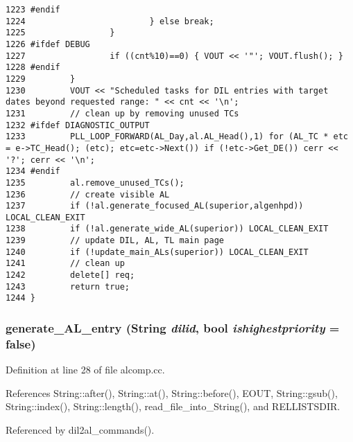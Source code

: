\begin{verbatim}
1223 #endif
1224                         } else break;
1225                 }
1226 #ifdef DEBUG
1227                 if ((cnt%10)==0) { VOUT << '"'; VOUT.flush(); }
1228 #endif
1229         }
1230         VOUT << "Scheduled tasks for DIL entries with target dates beyond requested range: " << cnt << '\n';
1231         // clean up by removing unused TCs
1232 #ifdef DIAGNOSTIC_OUTPUT
1233         PLL_LOOP_FORWARD(AL_Day,al.AL_Head(),1) for (AL_TC * etc = e->TC_Head(); (etc); etc=etc->Next()) if (!etc->Get_DE()) cerr << '?'; cerr << '\n';
1234 #endif
1235         al.remove_unused_TCs();
1236         // create visible AL
1237         if (!al.generate_focused_AL(superior,algenhpd)) LOCAL_CLEAN_EXIT
1238         if (!al.generate_wide_AL(superior)) LOCAL_CLEAN_EXIT
1239         // update DIL, AL, TL main page
1240         if (!update_main_ALs(superior)) LOCAL_CLEAN_EXIT
1241         // clean up
1242         delete[] req;
1243         return true;
1244 }
\end{verbatim}\normalsize 
{}
\subsubsection{ generate\_\-AL\_\-entry ({\bf String} {\em dilid}, bool {\em ishighestpriority} = {\bf false})}\label{alcomp_8cc_a5}




Definition at line 28 of file alcomp.cc.

References String::after(), String::at(), String::before(), EOUT, String::gsub(), String::index(), String::length(), read\_\-file\_\-into\_\-String(), and RELLISTSDIR.

Referenced by dil2al\_\-commands().



